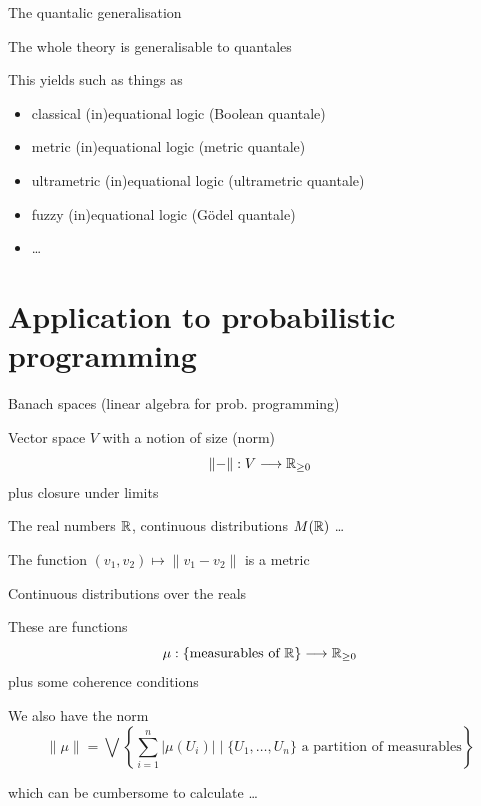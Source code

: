 \documentclass{beamer}
\begin{document}
\begin{frame}{The quantalic generalisation}

        The whole theory is generalisable to \alert{quantales}

        \medskip
        \pause
        This yields such as things as 
        \begin{itemize}
                \item classical (in)equational logic (Boolean quantale)
                        \\[5pt]
                \item metric (in)equational logic (metric quantale)
                        \\[5pt]
                \item ultrametric (in)equational logic (ultrametric quantale)
                        \\[5pt]
                \item fuzzy (in)equational logic (Gödel quantale)
                        \\[5pt]
                \item \dots
        \end{itemize}
\end{frame}
\section{Application to probabilistic programming}

\begin{frame}{Banach spaces (linear algebra for prob. programming)}

        Vector space $V$ with a notion of size (norm)
        \[
              \lVert - \rVert : V \longrightarrow \mathbb{R}_{\geq 0}
        \]
        plus closure under limits

        \bigskip
        \begin{examples}
         The real numbers $\mathbb{R}$, continuous distributions $M(\mathbb{R})$ \dots
        \end{examples}

        \pause
        \bigskip
        The function $(v_1,v_2) \mapsto \lVert v_1 - v_2 \rVert$ is a \alert{metric}
\end{frame}

\begin{frame}{Continuous distributions over the reals}

        These are functions
        \[
                \mu : \{ \text{measurables of } \mathbb{R} \} \longrightarrow \mathbb{R}_{\geq 0}
        \]
        plus some coherence conditions


        \bigskip
        \pause
        We also have the norm
        \[
                \lVert \mu \rVert = \bigvee
                \left \{ \sum_{i = 1}^n | \mu(U_i) | \mid \{U_1,\dots,U_n\} \text{ a partition of measurables} \right \}
        \]

        \pause
        which can be cumbersome to calculate \dots
\end{frame}
\end{document}
